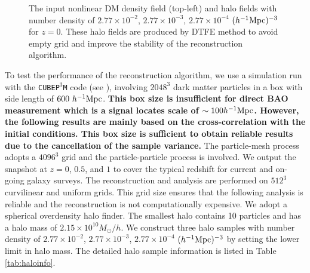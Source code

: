 \documentclass[iop]{emulateapj}
\newcommand{\mpch}{h^{-1} {\rm Mpc}}
\newcommand{\Msun}{M_{\odot}}
\begin{document}
{%
\begin{figure*}
\epsfxsize=18cm
\caption{The input nonlinear DM density field (top-left) and halo fields with number density of $2.77\times 10^{-2}$,
$2.77\times 10^{-3}$, $2.77\times 10^{-4}$ $(\mpch)^{-3}$ for $z=0$.
These halo fields are produced by DTFE method to avoid empty grid and improve the stability of the reconstruction algorithm.}
\label{fig:maps}
\end{figure*}

To test the performance of the reconstruction algorithm,
we use a simulation run with the \texttt{CUBEP$^3$M} code (see \cite{cubep3m}), involving $2048^3$ dark matter particles in a box with side length of $600\ \mpch$.
{\bf This box size is insufficient for direct BAO measurement which is a signal locates scale of $\sim 100\mpch$.  However, the following results are mainly based on the cross-correlation with the initial conditions.  This box size is sufficient to obtain reliable results due to the cancellation of the sample variance.}
The particle-mesh process adopts a $4096^3$ grid and the particle-particle process is involved.
We output the snapshot at $z=0$, $0.5$, and $1$ to cover the typical redshift for current and on-going galaxy surveys.
The reconstruction and analysis are performed on $512^3$ curvilinear and uniform grids.
This grid size ensures that the following analysis is reliable and the reconstruction is not computationally expensive.
We adopt a spherical overdensity halo finder.
The smallest halo contains 10 particles and has a halo mass of $2.15\times 10^{10}\Msun/h$.
We construct three halo samples with number density of $2.77\times 10^{-2}$, $2.77\times 10^{-3}$, $2.77\times 10^{-4}$ $(\mpch)^{-3}$ by setting the lower limit in halo mass.
The detailed halo sample information is listed in Table \ref{tab:haloinfo}.

}
\end{document}
